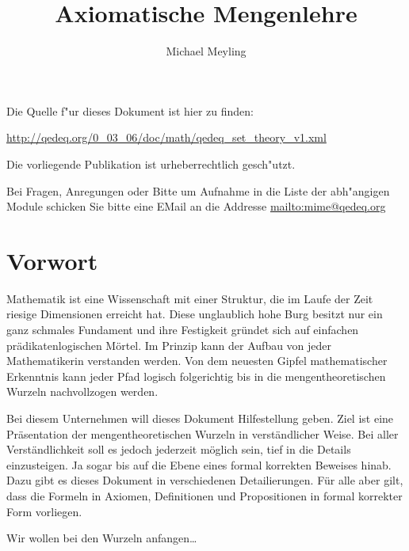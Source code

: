 \documentclass[a4paper,german,10pt,twoside]{book}
\title{Axiomatische Mengenlehre}
\author{
Michael Meyling
}
\theoremstyle{definition}
\theoremstyle{remark}
\begin{document}
\maketitle

\setlength{\parskip}{5pt plus 2pt minus 1pt}
\mbox{}
\vfill

\par
Die Quelle f{"ur} dieses Dokument ist hier zu finden:
\par
\url{http://qedeq.org/0_03_06/doc/math/qedeq_set_theory_v1.xml}

\par
Die vorliegende Publikation ist urheberrechtlich gesch{"u}tzt.
\par
Bei Fragen, Anregungen oder Bitte um Aufnahme in die Liste der abh{"a}ngigen Module schicken Sie bitte eine EMail an die Addresse \url{mailto:mime@qedeq.org}

\setlength{\parskip}{0pt}
\tableofcontents

\setlength{\parskip}{5pt plus 2pt minus 1pt}

\chapter*{Vorwort\label{ch:preface}} \label{chapter0} \hypertarget{chapter0}{}

Mathematik ist eine Wissenschaft mit einer Struktur, die im Laufe der Zeit riesige Dimensionen erreicht hat. Diese unglaublich hohe Burg besitzt nur ein ganz schmales Fundament und ihre Festigkeit gr{\"u}ndet sich auf einfachen pr{\"a}dikatenlogischen M{\"o}rtel. Im Prinzip kann der Aufbau von jeder Mathematikerin verstanden werden. Von dem neuesten Gipfel mathematischer Erkenntnis kann jeder Pfad logisch folgerichtig bis in die mengentheoretischen Wurzeln nachvollzogen werden.

\par
Bei diesem Unternehmen will dieses Dokument Hilfestellung geben. Ziel ist eine Pr{\"a}sentation der mengentheoretischen Wurzeln in verst{\"a}ndlicher Weise. Bei aller Verst{\"a}ndlichkeit soll es jedoch jederzeit m{\"o}glich sein, tief in die Details einzusteigen. Ja sogar bis auf die Ebene eines formal korrekten Beweises hinab. Dazu gibt es dieses Dokument in verschiedenen Detailierungen. F{\"u}r alle aber gilt, dass die Formeln in Axiomen, Definitionen und Propositionen in formal korrekter Form vorliegen.

\par
Wir wollen bei den Wurzeln anfangen\ldots
\end{document}
